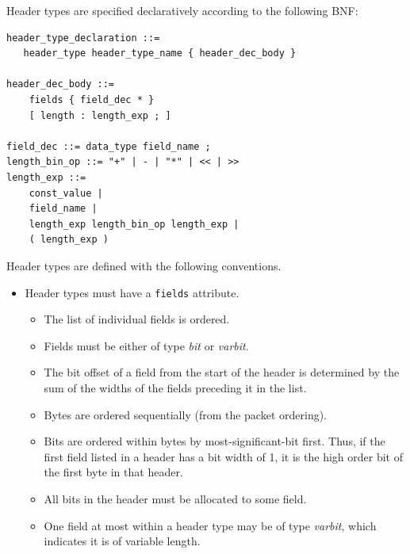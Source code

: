 \documentclass[12pt]{article}
\begin{document}
Header types are specified declaratively according to the following BNF:

\begin{lstlisting}[style=BNFstyle]
header_type_declaration ::= 
   header_type header_type_name { header_dec_body }

header_dec_body ::=
    fields { field_dec * }
    [ length : length_exp ; ]

field_dec ::= data_type field_name ;
length_bin_op ::= "+" | - | "*" | << | >>
length_exp ::=
    const_value |
    field_name |
    length_exp length_bin_op length_exp |
    ( length_exp )

\end{lstlisting}

Header types are defined with the following conventions.
\begin{itemize}
\item
Header types must have a \texttt{fields} attribute. 
\begin{itemize}
\item
The list of individual fields is ordered.
\item
Fields must be either of type \textit{bit} or \textit{varbit}.
\item
The bit offset of a field from the start of the header is determined by the 
sum of the widths of the fields preceding it in the list.
\item
Bytes are ordered sequentially (from the packet ordering).
\item
Bits are ordered within bytes by most-significant-bit first.  Thus, if the 
first field listed in a header has a bit width of 1, it is the high order 
bit of the first byte in that header.
\item
All bits in the header must be allocated to some field.
\item
One field at most within a header type may be of type \textit{varbit}, which 
indicates it is of variable length.
\end{itemize}


\end{itemize}
\end{document}
